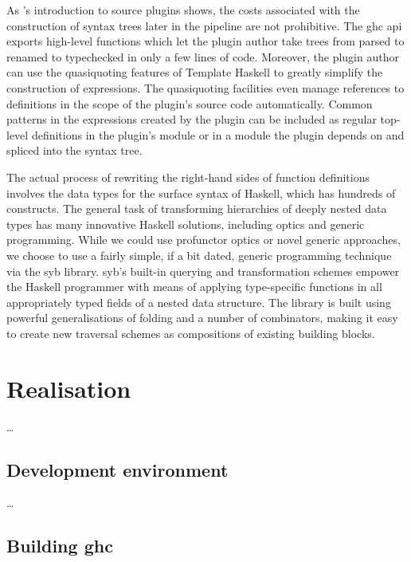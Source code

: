 \documentclass[thesis=B,english]{FITthesis}[2019/12/23]
\begin{document}
As \citeauthor{blog-source-plugins}'s introduction to source plugins shows, the
costs associated with the construction of syntax trees later in the pipeline
are not prohibitive\cite{blog-source-plugins}. The \acrshort{ghc}
\acrshort{api} exports high-level functions which let the plugin author take
trees from parsed to renamed to typechecked in only a few lines of code.
Moreover, the plugin author can use the quasi\-quoting\cite{th-quasiquoting}
features of Template Haskell\cite{th-classic} to greatly simplify the
construction of expressions. The quasi\-quoting facilities even manage
references to definitions in the scope of the plugin's source code
automatically. Common patterns in the expressions created by the plugin can be
included as regular top-level definitions in the plugin's module or in a module
the plugin depends on and spliced into the syntax tree.

The actual process of rewriting the right-hand sides of function definitions
involves the data types for the surface syntax of Haskell, which has hundreds
of constructs\cite[Key~Design~Choices]{arch-ghc}. The general task of
transforming hierarchies of deeply nested data types has many innovative
Haskell solutions, including optics and generic programming. While we could use
pro\-functor optics or novel generic approaches, we choose to use a fairly
simple, if a bit dated, generic programming technique via the \acrfull{syb}
library\cite{syb-paper}. \acrshort{syb}'s built-in querying and transformation
schemes empower the Haskell programmer with means of applying type-specific
functions in all appropriately typed fields of a nested data structure. The
library is built using powerful generalisations of folding and a number of
combinators, making it easy to create new traversal schemes as compositions of
existing building blocks.


\chapter{Realisation}
\ldots

\section{Development environment}
\ldots

\section{Building \acrshort{ghc}}
\end{document}
